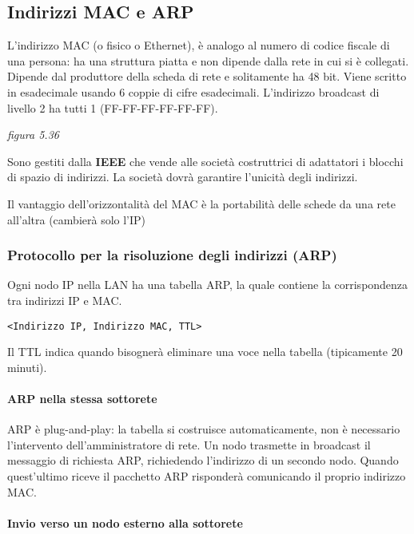 \documentclass[
]{article}
\begin{document}
\hypertarget{header-n110}{%
\subsection{Indirizzi MAC e ARP}\label{header-n110}}

L'indirizzo MAC (o fisico o Ethernet), è analogo al numero di codice
fiscale di una persona: ha una struttura piatta e non dipende dalla rete
in cui si è collegati. Dipende dal produttore della scheda di rete e
solitamente ha 48 bit. Viene scritto in esadecimale usando 6 coppie di
cifre esadecimali. L'indirizzo broadcast di livello 2 ha tutti 1
(FF-FF-FF-FF-FF-FF).

\emph{figura 5.36}

Sono gestiti dalla \textbf{IEEE} che vende alle società costruttrici di
adattatori i blocchi di spazio di indirizzi. La società dovrà garantire
l'unicità degli indirizzi.

Il vantaggio dell'orizzontalità del MAC è la portabilità delle schede da
una rete all'altra (cambierà solo l'IP)

\hypertarget{header-n115}{%
\subsubsection{Protocollo per la risoluzione degli indirizzi
(ARP)}\label{header-n115}}

Ogni nodo IP nella LAN ha una tabella ARP, la quale contiene la
corrispondenza tra indirizzi IP e MAC.

\begin{verbatim}
<Indirizzo IP, Indirizzo MAC, TTL>
\end{verbatim}

Il TTL indica quando bisognerà eliminare una voce nella tabella
(tipicamente 20 minuti).

\hypertarget{header-n119}{%
\paragraph{ARP nella stessa sottorete}\label{header-n119}}

ARP è plug-and-play: la tabella si costruisce automaticamente, non è
necessario l'intervento dell'amministratore di rete. Un nodo trasmette
in broadcast il messaggio di richiesta ARP, richiedendo l'indirizzo di
un secondo nodo. Quando quest'ultimo riceve il pacchetto ARP risponderà
comunicando il proprio indirizzo MAC.

\hypertarget{header-n121}{%
\paragraph{Invio verso un nodo esterno alla
sottorete}\label{header-n121}}
\end{document}
